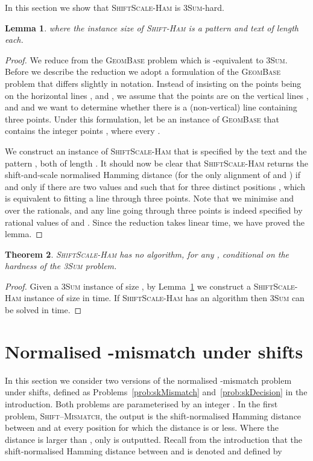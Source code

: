 \documentclass[11pt]{article}
\newcommand{\sHam}{\textsc{Shift-Ham}\xspace}
\newcommand{\ssHam}{\textsc{ShiftScale-Ham}\xspace}
\newcommand{\skMismatch}{\textsc{Shift--Mismatch}\xspace}
\newcommand{\threeSUM}{\textsc{3Sum}\xspace}
\newcommand{\geombase}{\textsc{GeomBase}\xspace}
\theoremstyle{plain}
\newtheorem{theorem}{Theorem}[]
\newtheorem{lemma}[theorem]{Lemma}
\theoremstyle{definition}
\begin{document}
In this section we show that \ssHam is \threeSUM-hard.

\begin{lemma}
    \label{lem:ssHamHard}
     where the instance size of \sHam is a pattern and text of length  each.
\end{lemma}
\begin{proof}
    We reduce from the \geombase problem which is -equivalent to \threeSUM. Before we describe the reduction we adopt a formulation of the \geombase problem that differs slightly in notation. Instead of insisting on the points being on the horizontal lines ,  and , we assume that the points are on the vertical lines ,  and  and we want to determine whether there is a (non-vertical) line containing three points. Under this formulation, let  be an instance of \geombase that contains the integer points , where every .

    We construct an instance of \ssHam that is specified by the text  and the pattern , both of length . It should now be clear that \ssHam returns the shift-and-scale normalised Hamming distance  (for the only alignment of  and ) if and only if there are two values  and  such that  for three distinct positions , which is equivalent to fitting a line through three points. Note that we minimise  and  over the rationals, and any line going through three points is indeed specified by rational values of  and . Since the reduction takes linear time, we have proved the lemma.
\end{proof}

\begin{theorem}
    \label{thm:ssHamLower}
    \ssHam has no  algorithm, for any , conditional on the hardness of the \threeSUM problem.
\end{theorem}
\begin{proof}
    Given a \threeSUM instance of size , by Lemma~\ref{lem:ssHamHard} we construct a \ssHam instance of size  in  time. If \ssHam has an  algorithm then \threeSUM can be solved in  time.
\end{proof}



\section{Normalised -mismatch under shifts}\label{sec:TIk}

In this section we consider two versions of the normalised -mismatch problem under shifts, defined as Problems~\ref{prob:skMismatch} and~\ref{prob:skDecision} in the introduction. Both problems are parameterised by an integer . In the first problem, \skMismatch, the output is the shift-normalised Hamming distance between  and  at every position for which the distance is  or less. Where the distance is larger than , only  is outputted. Recall from the introduction that the shift-normalised Hamming distance between  and  is denoted  and defined by
\end{document}
